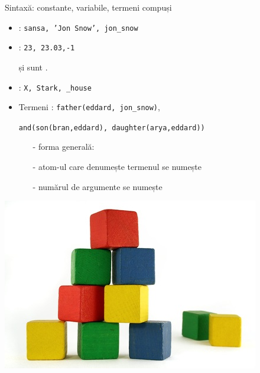 \documentclass[xcolor=x11names,compress,10pt]{beamer}
\begin{document}
\begin{frame}{Sintaxă: constante, variabile, termeni compuși}

\bigskip

\begin{itemize}
	
		
		  \item {}: \texttt{sansa, 'Jon Snow', 
		  jon\_snow}
		  \bigskip
		  \item {}: \texttt{23, 23.03,-1}
		
		\medskip
		
		 și  sunt .
		\medskip
		\item {}: \texttt{X, Stark, \_house}

		\bigskip
			\item Termeni : \texttt{father(eddard, jon\_snow)},
			
\hspace*{1cm}\texttt{and(son(bran,eddard), daughter(arya,eddard))}

\begin{itemize}
\item[-]   forma generală:	
 \item[-]  atom-ul care denumește termenul se numește 		      	
			      	
\item[-] numărul de argumente se numește 			      	\end{itemize}
\end{itemize}

\begin{center}
\includegraphics[scale=.2]{img/building-blocks}
\end{center}
\end{frame}
\end{document}
